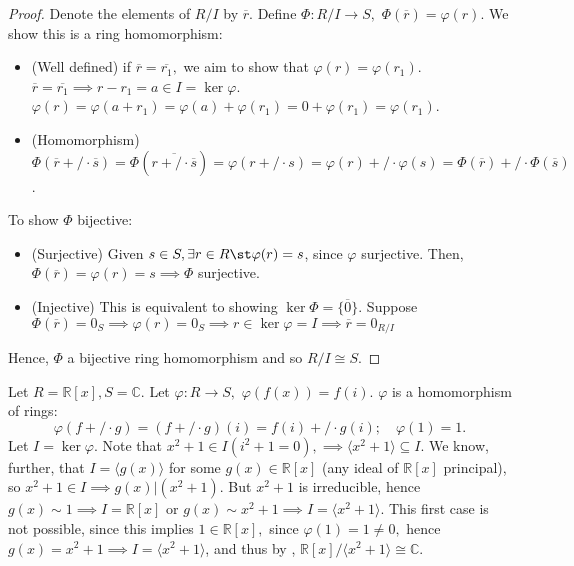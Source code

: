 \documentclass[12pt,oneside]{article}
\begin{document}
\begin{proof}
  Denote the elements of $R /I$ by $\overline{r}$. Define $\varPhi : R/I \to S,$ $\varPhi(\overline{r}) = \varphi(r)$. We show this is a ring homomorphism:
  \begin{itemize}
    \item (Well defined) if $\overline{r} = \overline{r_1},$ we aim to show that $\varphi(r) = \varphi(r_1)$. $\overline{r} = \overline{r_1} \implies r - r_1 = a \in I = \ker \varphi$. $\varphi(r) = \varphi(a+r_1) = \varphi(a) + \varphi(r_1) = 0 + \varphi(r_1) = \varphi(r_1)$.
    \item (Homomorphism) $\varPhi(\overline{r} +/\cdot \overline{s}) = \varPhi (\overline{r +/\cdot \overline{s}}) = \varphi(r + /\cdot s) = \varphi(r) +/\cdot \varphi(s) = \varPhi(\overline{r}) +/\cdot \varPhi(\overline{s})$.
  \end{itemize}
  To show $\varPhi$ bijective:
  \begin{itemize}
    \item (Surjective) Given $s \in S, \exists r \in R \st \varphi(r) = s$, since $\varphi$ surjective. Then, $\varPhi (\overline{r}) = \varphi(r) = s \implies \varPhi$ surjective.
    \item (Injective) This is equivalent to showing $\ker \varPhi = \{\overline{0}\}$. Suppose $\varPhi(\overline{r}) = 0_S \implies \varphi(r) = 0_S \implies r \in \ker \varphi = I \implies \overline{r} = 0_{R/I}$
  \end{itemize}
  Hence, $\varPhi$ a bijective ring homomorphism and so $R/I \cong S$.
\end{proof}

\begin{example}
Let $R = \mathbb{R}[x], S = \mathbb{C}$. Let $\varphi : R \to S,$ $\varphi(f(x)) = f(i)$. $\varphi$ is a homomorphism of rings:
\[
\varphi (f +/\cdot g) = (f+/\cdot g)(i) = f(i) +/\cdot g(i); \quad \varphi (1) = 1.
\]
Let $I = \ker \varphi$. Note that $x^2 + 1 \in I (i^2 + 1 = 0), \implies \langle x^2 + 1 \rangle \subseteq I$. We know, further, that $I = \langle g(x)\rangle$ for some $g(x) \in \mathbb{R}[x]$ (any ideal of $\mathbb{R}[x]$ principal), so $x^2 + 1 \in I \implies g(x) | (x^2+1)$. But $x^2 + 1$ is irreducible, hence $g(x) \sim 1 \implies I = \mathbb{R}[x]$ or $g(x) \sim x^2 + 1 \implies I = \langle x^2 + 1\rangle$. This first case is not possible, since this implies $1 \in \mathbb{R}[x],$ since $\varphi(1) = 1 \neq 0,$ hence $g(x) = x^2 + 1 \implies I = \langle x^2 + 1 \rangle$, and thus by , $\mathbb{R}[x]/\langle x^2 + 1\rangle \cong \mathbb{C}$.
\end{example}
\end{document}
